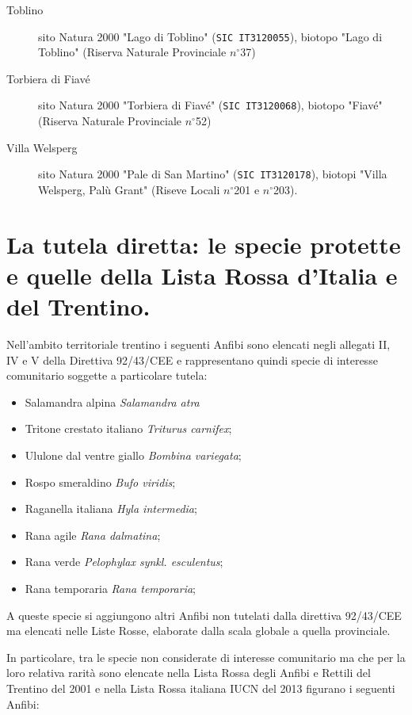 \documentclass[11pt,a4paper,twoside]{memoir}
\begin{document}
\begin{description}
  \item[Toblino] sito Natura 2000 "Lago di Toblino" (\texttt{SIC IT3120055}), biotopo "Lago di Toblino" (Riserva Naturale Provinciale $n^{\circ}$37)
  \item[Torbiera di Fiavé] sito Natura 2000 "Torbiera di Fiavé" (\texttt{SIC IT3120068}), biotopo "Fiavé" (Riserva Naturale Provinciale $n^{\circ}$52)
  \item[Villa Welsperg] sito Natura 2000 "Pale di San Martino" (\texttt{SIC IT3120178}), biotopi "Villa Welsperg, Palù Grant" (Riseve Locali $n^{\circ}$201 e $n^{\circ}$203).
\end{description}

\section{La tutela diretta: le specie protette e quelle della Lista Rossa d’Italia e del Trentino.}
\label{sec:norme_redlist}
Nell'ambito territoriale trentino i seguenti Anfibi sono elencati negli allegati II, IV e V della Direttiva 92/43/CEE e rappresentano quindi specie di interesse comunitario soggette a particolare tutela:

\begin{itemize}\itemsep0pt
  \item Salamandra alpina \emph{Salamandra atra}
  \item Tritone crestato italiano \emph{Triturus carnifex};
  \item Ululone dal ventre giallo \emph{Bombina variegata};
  \item Rospo smeraldino \emph{Bufo viridis};
  \item Raganella italiana \emph{Hyla intermedia};
  \item Rana agile \emph{Rana dalmatina};
  \item Rana verde \emph{Pelophylax synkl. esculentus};
  \item Rana temporaria \emph{Rana temporaria};
\end{itemize}

A queste specie si aggiungono altri Anfibi non tutelati dalla direttiva 92/43/CEE ma elencati  nelle Liste Rosse, elaborate dalla scala globale a quella provinciale.

In particolare, tra le specie non considerate di interesse comunitario ma che per la loro relativa rarità sono elencate nella Lista Rossa degli Anfibi e Rettili del Trentino del 2001 e nella Lista Rossa  italiana IUCN del 2013 figurano i seguenti Anfibi:
\end{document}
